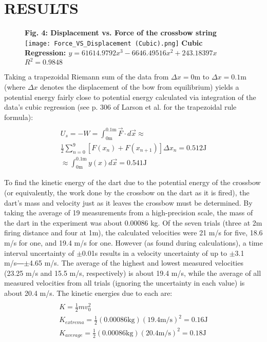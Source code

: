\documentclass[twocolumn, 10pt]{article}
\begin{document}
\section*{RESULTS}
\begin{figure} [h]
    \centering
    \textbf{Fig. 4: Displacement vs. Force of the crossbow string}
    \texttt{[image: Force\_VS\_Displacement (Cubic).png]}
    \textbf{Cubic Regression: $y=61614.9792x^3-6646.49516x^2+243.18397x$ \quad $R^2=0.9848$}
\end{figure}
Taking a trapezoidal Riemann sum of the data from $\Delta x=0\text{m}$ to $\Delta x=0.1\text{m}$ (where $\Delta x$ denotes the displacement of the bow from equilibrium) yields a potential energy fairly close to potential energy calculated via integration of the data’s cubic regression (see p. 306 of Larson et al. for the trapezoidal rule formula):
\vspace{-10pt}
\begin{gather*}
	\\U_s=-W=\int_{0\text{m}}^{0.1\text{m}} \vec{F} \cdot d\vec{x} \approx
\\ \frac{1}{2}\sum_{n=0}^{9} [F(x_n)+F(x_{n+1})]\Delta x_n = 0.512 \text{J}
\\ \approx \int_{0\text{m}}^{0.1\text{m}} y(x) d\vec{x} = 0.541 \text{J}
\end{gather*}

To find the kinetic energy of the dart due to the potential energy of the crossbow (or equivalently, the work done by the crossbow on the dart as it is fired), the dart’s mass and velocity just as it leaves the crossbow must be determined. By taking the average of 19 measurements from a high-precision scale, the mass of the dart in the experiment was about 0.00086 kg. Of the seven trials (three at 2m firing distance and four at 1m), the calculated velocities were 21 m/s for five, 18.6 m/s for one, and 19.4 m/s for one. However (as found during calculations), a time interval uncertainty of $\pm$0.01s results in a velocity uncertainty of up to $\pm$3.1 m/s―$\pm$4.65 m/s. The average of the highest and lowest measured velocities (23.25 m/s and 15.5 m/s, respectively) is about 19.4 m/s, while the average of all measured velocities from all trials (ignoring the uncertainty in each value) is about 20.4 m/s. The kinetic energies due to each are:
\vspace{-10pt}
\begin{gather*}
	\\K = \frac{1}{2}mv_0^2
	\\ K_{extrema} = \frac{1}{2}(0.00086\text{kg})(19.4\text{m/s})^2=0.16\text{J}
	\\ K_{average} = \frac{1}{2}(0.00086\text{kg})(20.4\text{m/s})^2=0.18 \text{J}
\end{gather*}
\end{document}
